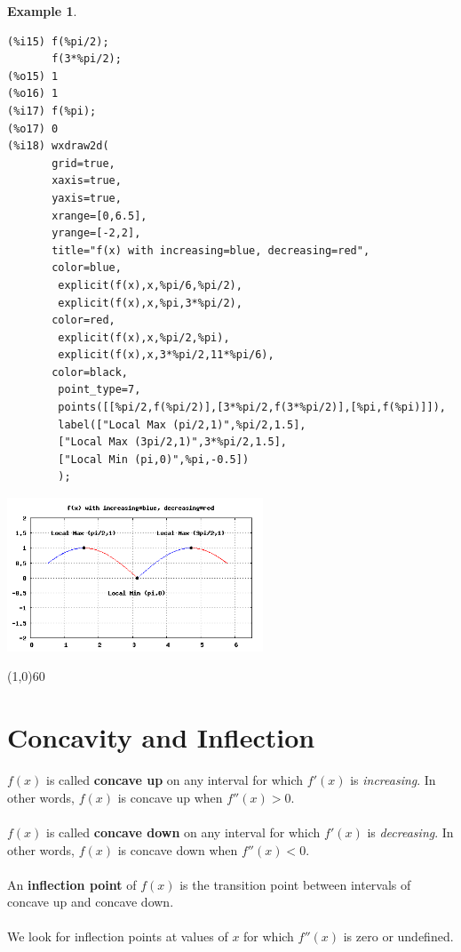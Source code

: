 \documentclass[10.5pt,twoside]{report}
\theoremstyle{definition}
\newtheorem{exmp}{Example}[section]
\begin{document}
\begin{exmp}
\begin{verbatim}
(%i15) f(%pi/2);
       f(3*%pi/2);
(%o15) 1
(%o16) 1
(%i17) f(%pi);
(%o17) 0
(%i18) wxdraw2d(
       grid=true,
       xaxis=true,
       yaxis=true,
       xrange=[0,6.5],
       yrange=[-2,2],
       title="f(x) with increasing=blue, decreasing=red",
       color=blue,
        explicit(f(x),x,%pi/6,%pi/2),
        explicit(f(x),x,%pi,3*%pi/2),
       color=red,
        explicit(f(x),x,%pi/2,%pi),
        explicit(f(x),x,3*%pi/2,11*%pi/6),
       color=black,
        point_type=7,
        points([[%pi/2,f(%pi/2)],[3*%pi/2,f(3*%pi/2)],[%pi,f(%pi)]]),
        label(["Local Max (pi/2,1)",%pi/2,1.5],
        ["Local Max (3pi/2,1)",3*%pi/2,1.5],
        ["Local Min (pi,0)",%pi,-0.5])
        );
\end{verbatim}

\includegraphics[width=3in]{example_5_1_2_2}

\end{exmp}

\line(1,0){60}
\linethickness{0.5mm}

\pagebreak

\section{Concavity and Inflection}\label{Concavity and Inflection}

$f(x)$ is called \textbf{concave up} on any interval for which $f'(x)$ is \textit{increasing}.  In other words, $f(x)$ is concave up when $f''(x)>0$.\\
${}$\\
$f(x)$ is called \textbf{concave down} on any interval for which $f'(x)$ is \textit{decreasing}.  In other words, $f(x)$ is concave down when $f''(x)<0$.\\
${}$\\
An \textbf{inflection point} of $f(x)$ is the transition point between intervals of concave up and concave down.  \\
${}$\\
We look for inflection points at values of $x$ for which $f''(x)$ is zero or undefined.\\
${}$\\
\end{document}
